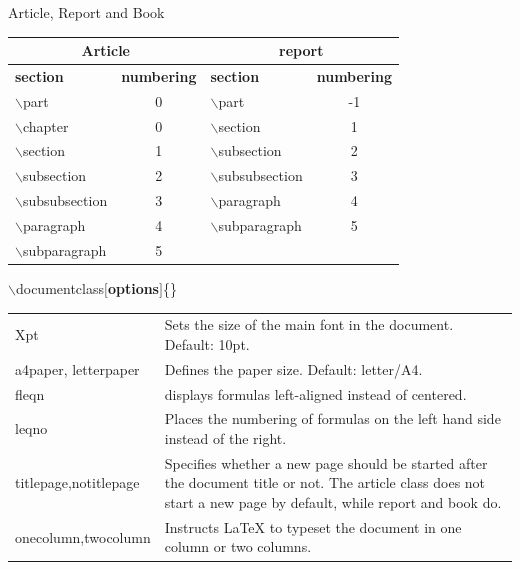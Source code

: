 \documentclass[10pt,xcolor=table]{beamer}
\begin{document}
\begin{frame}{Article, Report and Book}
\begin{table}
\begin{tabular}{|l|c|l|c|}
\hline
\multicolumn{2}{c}{\textbf{Article}}  & \multicolumn{2}{c}{\textbf{report}} \\ 
\hline
\textbf{section} &\textbf{ numbering} & \textbf{section} & \textbf{numbering} \\ \hline
$\backslash$part & 0 & $\backslash$part & -1 \\ \hline
$\backslash$chapter & 0 & $\backslash$section & 1 \\ \hline
$\backslash$section & 1 & $\backslash$subsection & 2 \\ \hline
$\backslash$subsection & 2 & $\backslash$subsubsection & 3 \\ \hline
$\backslash$subsubsection & 3 & $\backslash$paragraph & 4 \\ \hline
$\backslash$paragraph & 4 & $\backslash$subparagraph & 5 \\ \hline
$\backslash$subparagraph & 5 & & \\ \hline

\end{tabular}
\end{table}
\end{frame}

\begin{frame}{$\backslash$documentclass$[$\textbf{options}$]$\{\}}
\begin{table}
\begin{tabular}{|p{}|p{}|}
\hline
Xpt & Sets the size of the main font in the document. Default: 10pt. \\
a4paper, \newline letterpaper & Defines the paper size. Default: letter/A4. \\
fleqn & displays formulas left-aligned instead of centered. \\
leqno & Places the numbering of formulas on the left hand side instead of the right. \\
titlepage,\newline  notitlepage & Specifies whether a new page should be started after the document title or not. The article class does not start a new page by default, while report and book do.\\
onecolumn,\newline  twocolumn & Instructs LaTeX to typeset the document in one column or two columns. \\
\end{tabular}
\end{table}
\end{frame}
\end{document}
